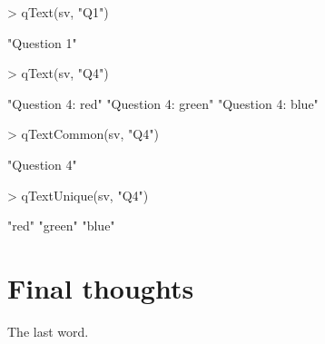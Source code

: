\documentclass[a4paper]{article}
\begin{document}
\begin{Schunk}
\begin{Sinput}
> qText(sv, "Q1")
\end{Sinput}
\begin{Soutput}
[1] "Question 1"
\end{Soutput}
\begin{Sinput}
> qText(sv, "Q4")
\end{Sinput}
\begin{Soutput}
[1] "Question 4: red"   "Question 4: green" "Question 4: blue" 
\end{Soutput}
\begin{Sinput}
> qTextCommon(sv, "Q4")
\end{Sinput}
\begin{Soutput}
[1] "Question 4"
\end{Soutput}
\begin{Sinput}
> qTextUnique(sv, "Q4")
\end{Sinput}
\begin{Soutput}
[1] "red"   "green" "blue" 
\end{Soutput}
\end{Schunk}


\section{Final thoughts}

The last word.


\end{document}
